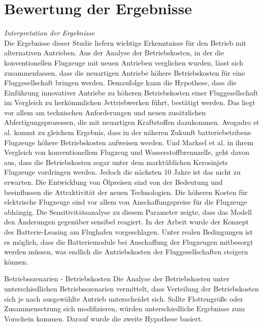 
\section{Bewertung der Ergebnisse}
\label{s:Bewertung der Ergebnisse}

\textit{Interpretation der Ergebnisse}\\
Die Ergebnisse dieser Studie liefern wichtige Erkenntnisse für den Betrieb mit alternativen Antrieben.
Aus der Analyse der Betriebskosten, in der die konventionellen Flugzeuge mit neuen Antrieben verglichen wurden, 
lässt sich zusammenfassen, dass die neuartigen Antriebe höhere Betriebskosten für eine Fluggesellschaft bringen werden.
Demzufolge kann die Hypothese, dass die Einführung innovativer Antriebe zu höheren Betriebskosten einer Fluggesellschaft im Vergleich zu herkömmlichen
Jettriebwerken führt, bestätigt werden. Das liegt vor allem am technischen Anforderungen und neuen zusätzlichen Abfertigungsprozessen, die mit neuartigen
Kraftstoffen dazukommen. Avogadro et al.\cite{avogadro2024demystifying} kommt zu gleichem Ergebnis, 
dass in der näheren Zukunft batteriebetribene Flugzeuge höhere Betriebskosten aufweisen werden. Und Marksel et al. \cite{marksel2023comparative} in ihrem
Vergleich von konventionellem Flugzeug und Wasserstoffbrennzelle, geht davon aus, dass die Betriebskosten sogar unter dem marktüblichen Kerosinjets
Flugzeuge vordringen werden. Jedoch die nächsten 10 Jahre ist das nicht zu erwarten. 
Die Entwicklung von Ölpreisen sind von der Bedeutung und beeinflussen
die Attraktivität der neuen Technologien.
%
Die höheren Kosten für elektrische Flugzeuge sind vor allem von Anschaffungspreise für
die Flugzeuge abhängig. Die Sensitivitätsanalyse zu diesem Parameter zeigte, dass das Modell den Änderungen gegenüber sensibel reagiert.
In der Arbeit wurde der Konzept des Batterie-Leasing am Flughafen vorgeschlagen. Unter realen Bedingungen ist es möglich, 
dass die Batteriemodule bei Anschaffung der Flugzeugen mitbesorgt werden müssen, was endlich die Antriebskosten der Fluggesellschaften steigern
können. 


Betriebsszenarien - Betriebskosten
Die Analyse der Betriebskosten unter unterschiedlichen Betriebsszenarien vermittelt, dass Verteilung der Betriebskosten sich je nach
ausgewählte Antrieb unterscheidet sich. Sollte Flottengröße oder Zusammensetzung sich modifizieren, würden unterschiedliche Ergebnisse zum Vorschein kommen.
Darauf wurde die zweite Hypothese basiert. 

